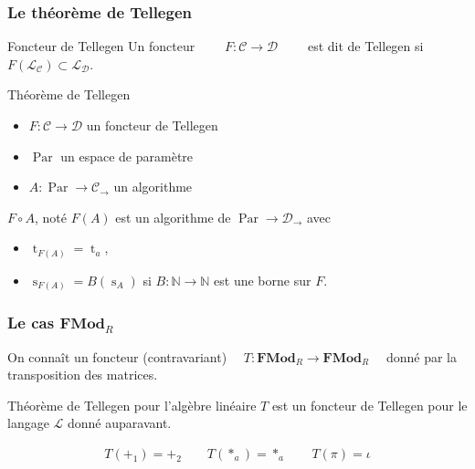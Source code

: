\documentclass[10pt]{beamer}
\newcommand{\cat}[1]{\mathscr{#1}}
\newcommand{\lcat}[1]{\mathbf{#1}}
\newcommand{\C}{\cat{C}}
\newcommand{\D}{\cat{D}}
\renewcommand{\L}{\cat{L}}
\newcommand{\comp}{\circ}
\newcommand{\N}{\mathbb{N}}
\newcommand{\ra}{\rightarrow}
\DeclareMathOperator{\Time}{t}
\DeclareMathOperator{\Space}{s}
\DeclareMathOperator{\Par}{Par}
\begin{document}
\begin{frame}
  \frametitle{Le théorème de Tellegen}

  \begin{block}{Foncteur de Tellegen}
    Un foncteur $\qquad F:\C\ra\D \qquad$ est dit de Tellegen si
    $F(\L_\C) \subset \L_\D$.
  \end{block}

  \begin{block}{Théorème de Tellegen}
    \begin{itemize}
    \item $F:\C\ra\D$ un foncteur de Tellegen
    \item $\Par$ un espace de paramètre
    \item $A:\Par\ra\C_\ra$ un algorithme
    \end{itemize}

    $F\comp A$, noté $F(A)$ est un algorithme de $\Par\ra\D_\ra$ avec
    \begin{itemize}
    \item $\Time_{F(A)} = \Time_a$,
    \item $\Space_{F(A)} = B(\Space_A)$ si $B:\N\ra\N$ est une borne sur $F$.
    \end{itemize}
  \end{block}
\end{frame}


\begin{frame}
  \frametitle{Le cas $\lcat{FMod}_R$}
  
  \begin{center}
    On connaît un foncteur (contravariant) $\quad
    T:\lcat{FMod}_R\ra\lcat{FMod}_R\quad$ donné par la transposition
    des matrices.
  \end{center}

  \begin{block}{Théorème de Tellegen pour l'algèbre linéaire}
    $T$ est un foncteur de Tellegen pour le langage $\L$ donné auparavant.
  \end{block}

  \begin{align*}
    T(+_1) = +_2 \qquad T(*_a) = *_a \qquad T(\pi) = \iota
  \end{align*}
\end{frame}
\end{document}
